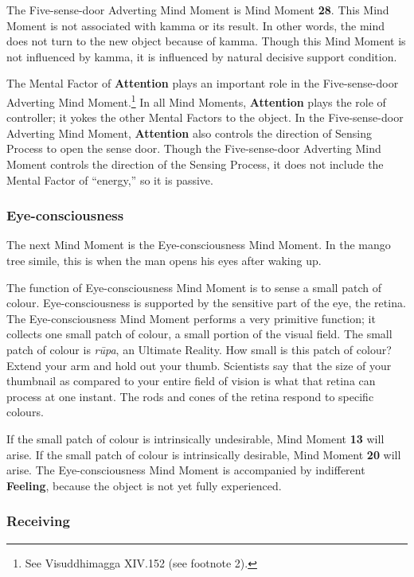 The Five-sense-door Adverting Mind Moment is Mind Moment \textbf{28}. This Mind Moment is not associated with kamma or its result. In other words, the mind does not turn to the new object because of kamma. Though this Mind Moment is not influenced by kamma, it is influenced by natural decisive support condition.

The Mental Factor of \textbf{Attention} plays an important role in the Five-sense-door Adverting Mind Moment.\footnote{See Visuddhimagga XIV.152 (see footnote 2).} In all Mind Moments, \textbf{Attention} plays the role of controller; it yokes the other Mental Factors to the object. In the Five-sense-door Adverting Mind Moment, \textbf{Attention} also controls the direction of Sensing Process to open the sense door. Though the Five-sense-door Adverting Mind Moment controls the direction of the Sensing Process, it does not include the Mental Factor of “energy,” so it is passive.

\subsubsection*{Eye-consciousness}

The next Mind Moment is the Eye-consciousness Mind Moment. In the mango tree simile, this is when the man opens his eyes after waking up.

The function of Eye-consciousness Mind Moment is to sense a small patch of colour. Eye-consciousness is supported by the sensitive part of the eye, the retina. The Eye-consciousness Mind Moment performs a very primitive function; it collects one small patch of colour, a small portion of the visual field. The small patch of colour is \textit{rūpa}, an Ultimate Reality. How small is this patch of colour? Extend your arm and hold out your thumb. Scientists say that the size of your thumbnail as compared to your entire field of vision is what that retina can process at one instant. The rods and cones of the retina respond to specific colours.

If the small patch of colour is intrinsically undesirable, Mind Moment \textbf{13} will arise. If the small patch of colour is intrinsically desirable, Mind Moment \textbf{20} will arise. The Eye-consciousness Mind Moment is accompanied by indifferent \textbf{Feeling}, because the object is not yet fully experienced.

\subsubsection*{Receiving}

